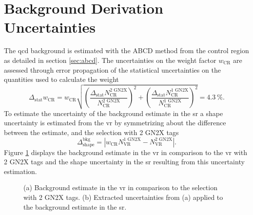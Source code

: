 \section{Background Derivation Uncertainties}\label{sec:bkg_uncertainties}
The \ac{qcd} background is estimated with the ABCD method from the control region as detailed in section \ref{sec:abcd}. The uncertainties on the weight factor $w_\text{CR}$ are assessed through error propagation of the statistical uncertainties on the quantities used to calculate the weight
\begin{equation}
    \Delta_\text{stat} w_\text{CR} = w_\text{CR} \sqrt{
        \left(\frac{\Delta_\text{stat} N_\text{CR}^\text{2 GN2X}}{N_\text{CR}^\text{2 GN2X}}\right)^2
        +
        \left(\frac{\Delta_\text{stat} N_\text{CR}^\text{1 GN2X}}{N_\text{CR}^\text{1 GN2X}}\right)^2
    }
    = \qty[]{4.3}{\percent}.
\end{equation}
To estimate the uncertainty of the background estimate in the \ac{sr} a shape uncertainty is estimated from the \ac{vr} by symmetrizing about the difference between the estimate, and the selection with 2 GN2X tags
\begin{equation}
    \Delta_\text{shape}^\text{bkg}= \left| w_\text{CR}N_\text{VR}^\text{1 GN2X} - N_\text{VR}^\text{2 GN2X}\right|.
\end{equation}
Figure \ref{fig:bkg_shape_estimate} displays the background estimate in the \ac{vr} in comparison to the \ac{vr} with 2 GN2X tags and the shape uncertainty in the \ac{sr} resulting from this uncertainty estimation.
\begin{figure}
    \centering
    \caption[]{(a) Background estimate in the \ac{vr} in comparison to the selection with 2 GN2X tags. (b) Extracted uncertainties from (a) applied to the background estimate in the \ac{sr}.}
    \label{fig:bkg_shape_estimate}
\end{figure}

